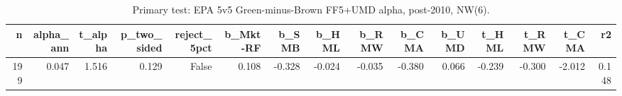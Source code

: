 \begin{table}
\caption{Primary test: EPA 5v5 Green-minus-Brown FF5+UMD alpha, post-2010, NW(6).}
\label{tab:m4_primary}
\begin{tabular}{rrrrrrrrrrrrrrr}
\toprule
n & alpha\_ann & t\_alpha & p\_two\_sided & reject\_5pct & b\_Mkt-RF & b\_SMB & b\_HML & b\_RMW & b\_CMA & b\_UMD & t\_HML & t\_RMW & t\_CMA & r2 \\
\midrule
199 & 0.047 & 1.516 & 0.129 & False & 0.108 & -0.328 & -0.024 & -0.035 & -0.380 & 0.066 & -0.239 & -0.300 & -2.012 & 0.148 \\
\bottomrule
\end{tabular}
\end{table}
